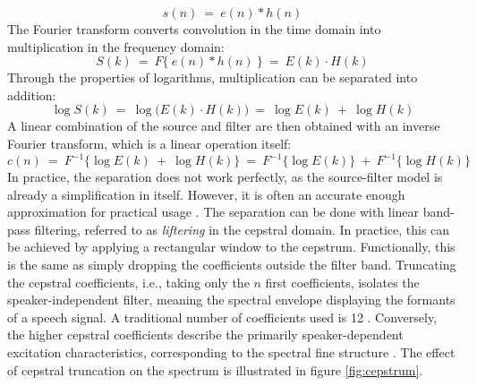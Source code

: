 \documentclass[english, 12pt, a4paper, pdftex, elec, utf8]{aaltothesis}
\begin{document}
\begin{equation}
s(n) \ = \ e(n) * h(n)
\end{equation}
The Fourier transform converts convolution in the time domain into multiplication in the frequency domain:
\begin{equation}
S(k) \ = \ F\big\{ \ e(n) * h(n) \ \big\} \ = \ E(k) \cdot H(k)
\end{equation}
Through the properties of logarithms, multiplication can be separated into addition:
\begin{equation}
\log S(k) \ = \ \log \big( E(k) \cdot H(k) \big) \ = \ \log E(k) \ + \ \log H(k)
\end{equation}
A linear combination of the source and filter are then obtained with an inverse Fourier transform, which is a linear operation itself:
\begin{equation}
c(n) \ = \ F^{-1} \big\{ \log E(k) \ + \ \log H(k) \big\} \ = \ F^{-1} \big\{\log  E(k) \big\} \ + \ F^{-1} \big\{\log H(k) \big\}
\end{equation}
In practice, the separation does not work perfectly, as the source-filter model is already a simplification in itself. However, it is often an accurate enough approximation for practical usage \cite[p.~314]{huang2001spoken}. The separation can be done with linear band-pass filtering, referred to as \textit{liftering} in the cepstral domain. In practice, this can be achieved by applying a rectangular window to the cepstrum. Functionally, this is the same as simply dropping the coefficients outside the filter band. Truncating the cepstral coefficients, i.e., taking only the $n$ first coefficients, isolates the speaker-independent filter, meaning the spectral envelope displaying the formants of a speech signal. A traditional number of coefficients used is 12 \cite{huang2001spoken, gales2008application}. Conversely, the higher cepstral coefficients describe the primarily speaker-dependent excitation characteristics, corresponding to the spectral fine structure \cite{gales2008application}. The effect of cepstral truncation on the spectrum is illustrated in figure \ref{fig:cepstrum}.
\end{document}
